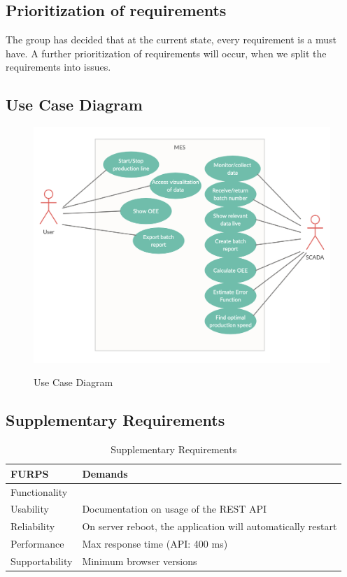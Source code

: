\subsection{Prioritization of requirements}
The group has decided that at the current state, every requirement is a must have.
A further prioritization of requirements will occur, when we split the requirements into issues.

\subsection{Use Case Diagram}
\begin{figure}[ht]
\centering 
\includegraphics[scale=0.5]{images/ucdiagram.png}
\label{figure:Use_Case_Diagram}
\caption{Use Case Diagram} 
\end{figure}

\subsection{Supplementary Requirements}
\begin{table}[ht]
    \begin{tabularx}{\textwidth}{|>{\RaggedRight}p{4cm}|>{\RaggedRight}X|}
        \hline
        \textbf{FURPS}          	& \textbf{Demands} \\
        \hline
        Functionality  	&  \\
        \hline
        Usability      	& Documentation on usage of the REST API \\
        \hline
        Reliability    	& On server reboot, the application will automatically restart \\
        \hline
        Performance    	& Max response time (API: 400 ms) \\
        \hline
        Supportability 	& Minimum browser versions \\
        \hline
    \end{tabularx}
    \caption{Supplementary Requirements} 
    \label{table:sup_requirements}
\end{table} 

